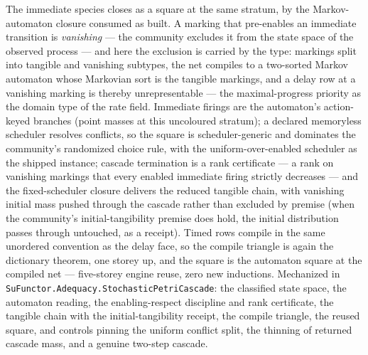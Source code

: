 The immediate species closes as a square at the same stratum, by the
Markov-automaton closure consumed as built.  A marking that
pre-enables an immediate transition is \emph{vanishing} --- the
community excludes it from the state space of the observed process
\cite{everdij-blom-2010} --- and here the exclusion is carried by the
type: markings split into tangible and vanishing subtypes, the net
compiles to a two-sorted Markov automaton whose Markovian sort is the
tangible markings, and a delay row at a vanishing marking is thereby
unrepresentable --- the maximal-progress priority as the domain type
of the rate field.  Immediate firings are the automaton's action-keyed
branches (point masses at this uncoloured stratum); a declared
memoryless scheduler resolves conflicts, so the square is
scheduler-generic and dominates the community's randomized choice
rule, with the uniform-over-enabled scheduler as the shipped instance;
cascade termination is a rank certificate --- a rank on vanishing
markings that every enabled immediate firing strictly decreases ---
and the fixed-scheduler closure delivers the reduced tangible chain,
with vanishing initial mass pushed through the cascade rather than
excluded by premise (when the community's initial-tangibility premise
does hold, the initial distribution passes through untouched, as a
receipt).  Timed rows compile in the same unordered convention as the
delay face, so the compile triangle is again the dictionary theorem,
one storey up, and the square is the automaton square at the compiled
net --- five-storey engine reuse, zero new inductions.  Mechanized in
\texttt{SuFunctor.Adequacy.StochasticPetriCascade}: the classified
state space, the automaton reading, the enabling-respect discipline
and rank certificate, the tangible chain with the initial-tangibility
receipt, the compile triangle, the reused square, and controls
pinning the uniform conflict split, the thinning of returned cascade
mass, and a genuine two-step cascade.

